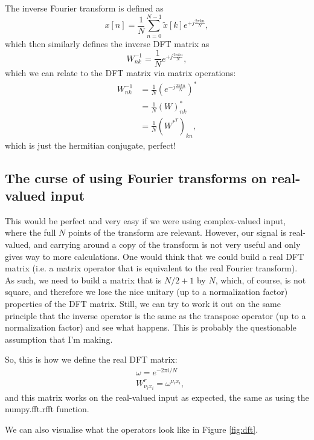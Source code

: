 \documentclass{article}
\begin{document}
The inverse Fourier transform is defined as
\begin{equation}
	x[n]=\frac{1}{N} \sum_{n=0}^{N-1} \tilde x[k] e^{+j\frac{2\pi kn}{N}},
\end{equation}
which then similarly defines the inverse DFT matrix as
\begin{equation}
	W^{-1}_{nk} = \frac{1}{N} e^{+j\frac{2\pi kn}{N}},
\end{equation}
which we can relate to the DFT matrix via matrix operations:
\begin{align}
	W^{-1}_{nk} &= \frac{1}{N} (e^{-j\frac{2\pi kn}{N}})^*\\
	&= \frac{1}{N} (W)^*_{nk}\\
	&= \frac{1}{N} (W^{*^T})_{kn},
\end{align}
which is just the hermitian conjugate, perfect!

\subsection{The curse of using Fourier transforms on real-valued input}

This would be perfect and very easy if we were using complex-valued input, where the full $N$ points of the transform are relevant.
However, our signal is real-valued, and carrying around a copy of the transform is not very useful and only gives way to more calculations.
One would think that we could build a real DFT matrix (i.e. a matrix operator that is equivalent to the real Fourier transform).
As such, we need to build a matrix that is $N/2+1$ by $N$, which, of course, is not square, and therefore we lose the nice unitary (up to a normalization factor) properties of the DFT matrix.
Still, we can try to work it out on the same principle that the inverse operator is the same as the transpose operator (up to a normalization factor) and see what happens.
This is probably the questionable assumption that I'm making.

So, this is how we define the real DFT matrix:
\begin{align}
	&\omega = e^{-2\pi i / N}\\
	&W^r_{\nu_i x_i} = \omega^{\nu_i x_i},
\end{align}
and this matrix works on the real-valued input as expected, the same as using the numpy.fft.rfft function.

We can also visualise what the operators look like in Figure \ref{fig:dft}.
\end{document}
